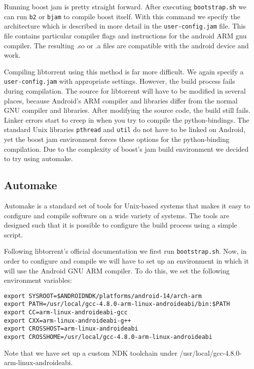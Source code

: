 		Running boost jam is pretty straight forward. After executing \texttt{bootstrap.sh} we can run \texttt{b2} or \texttt{bjam} to compile boost itself. With this command we specify the architecture which is described in more detail in the \texttt{user-config.jam} file. This file contains particular compiler flags and instructions for the android ARM gnu compiler. The resulting .so or .a files are compatible with the android device and work.
		
		Compiling libtorrent using this method is far more difficult. We again specify a \texttt{user-config.jam} with appropriate settings. However, the build process fails during compilation. The source for libtorrent will have to be modified in several places, because Android's ARM compiler and libraries differ from the normal GNU compiler and libraries. After modifying the source code, the build still fails. Linker errors start to creep in when you try to compile the python-bindings. The standard Unix libraries \texttt{pthread} and \texttt{util} do not have to be linked on Android, yet the boost jam environment forces these options for the python-binding compilation. Due to the complexity of boost's jam build environment we decided to try using automake.
		
		\subsection{Automake}
		Automake is a standard set of tools for Unix-based systems that makes it easy to configure and compile software on a wide variety of systems. The tools are designed such that it is possible to configure the build process using a simple script.
		
		Following libtorrent's official documentation we first run \texttt{bootstrap.sh}. Now, in order to configure and compile we will have to set up an environment in which it will use the Android GNU ARM compiler. To do this, we set the following environment variables:
		
		\begin{lstlisting}
export SYSROOT=$ANDROIDNDK/platforms/android-14/arch-arm
export PATH=/usr/local/gcc-4.8.0-arm-linux-androideabi/bin:$PATH
export CC=arm-linux-androideabi-gcc
export CXX=arm-linux-androideabi-g++
export CROSSHOST=arm-linux-androideabi
export CROSSHOME=/usr/local/gcc-4.8.0-arm-linux-androideabi
		\end{lstlisting}
		
		Note that we have set up a custom NDK toolchain under /usr/local/gcc-4.8.0-arm-linux-androideabi. 
		
